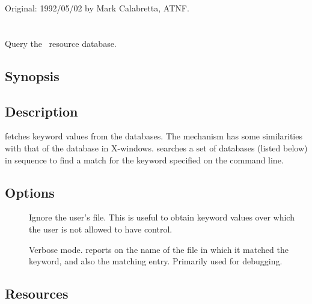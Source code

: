 Original: 1992/05/02 by Mark Calabretta, ATNF.


\newpage
\section{}
\label{getrc}

Query the \aipspp\ resource database.

\subsection*{Synopsis}

\begin{synopsis}
\end{synopsis}

\subsection*{Description}

 fetches keyword values from the  databases.  The
mechanism has some similarities with that of the  database in
X-windows.   searches a set of  databases (listed
below) in sequence to find a match for the keyword specified on the command
line.

\subsection*{Options}

\begin{description}
\item[]
   Ignore the user's  file.  This is useful to obtain keyword
   values over which the user is not allowed to have control.

\item[]
   Verbose mode.   reports on  the name of the file in
   which it matched the keyword, and also the matching entry.  Primarily used
   for debugging.
\end{description}

\subsection*{Resources}

